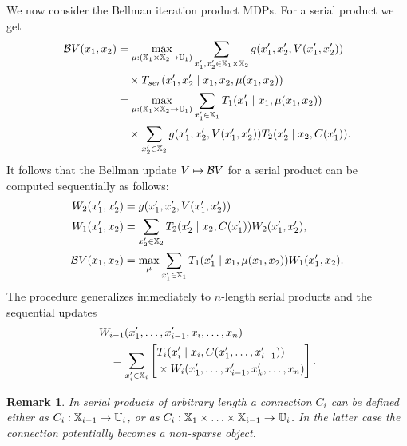 \documentclass[conference]{IEEEtran}
\newtheorem{remark}{Remark}
\begin{document}
We now consider the Bellman iteration product MDPs. For a serial product we get
\begin{equation*}
\begin{aligned}
  \mathcal{B} V (x_1, x_2) & = \max_{\mu: (\mathbb{X}_1 \times \mathbb{X}_2 \rightarrow \mathbb{U}_1)} \sum_{x_1', x_2' \in \mathbb{X}_1 \times \mathbb{X}_2}  g(x_1', x_2', V(x_1', x_2')) \\
  & \quad \times T_{ser}(x_1', x_2' \mid x_1, x_2, \mu(x_1, x_2)) \\
  & = \max_{\mu: (\mathbb{X}_1 \times \mathbb{X}_2 \rightarrow \mathbb{U}_1)} \sum_{x_1' \in \mathbb{X}_1} T_1(x_1' \mid x_1, \mu(x_1, x_2)) \\
  & \quad \times \sum_{x_2' \in \mathbb{X}_2}  g(x_1', x_2', V(x_1', x_2')) T_2(x_2' \mid x_2, C(x_1')).
\end{aligned}
\end{equation*}
It follows that the Bellman update $V \mapsto \mathcal{B} V$ for a serial product can be computed sequentially as follows:
\begin{equation*}
\begin{aligned}
  W_2(x_1', x_2') & = g(x_1', x_2', V(x_1', x_2')) \\
  W_1(x_1', x_2) & = \sum_{x_2' \in \mathbb{X}_2}  T_2(x_2' \mid x_2, C(x_1')) W_2(x_1', x_2'), \\
  \mathcal{B} V(x_1, x_2) & = \max_{\mu} \sum_{x_1' \in \mathbb{X}_1} T_1(x_1' \mid x_1, \mu(x_1, x_2)) W_1(x_1', x_2).
\end{aligned}
\end{equation*}
The procedure generalizes immediately to $n$-length serial products and the sequential updates
\begin{equation}
\label{eq:general_decomp}
\begin{aligned}
  & W_{i-1}(x_1', \ldots, x_{i-1}', x_i, \ldots, x_n) \\
  & \quad = \sum_{x_{i}' \in \X_{i}} \left[ \begin{aligned} & T_{i} (x_{i}' \mid x_{i}, C(x_1', \ldots, x_{i-1}')) \\ 
   & \times W_{i} (x_1', \ldots, x_{i-1}', x_k', \ldots, x_n)
    \end{aligned} \right].
\end{aligned}
\end{equation}

\begin{remark}
  In serial products of arbitrary length a connection $C_i$ can be defined either as $C_i: \mathbb{X}_{i-1} \rightarrow \mathbb{U}_i$, or as $C_i: \mathbb{X}_1 \times \ldots \times \mathbb{X}_{i-1} \rightarrow \mathbb{U}_i$. In the latter case the connection potentially becomes a non-sparse object.
\end{remark}
\end{document}
